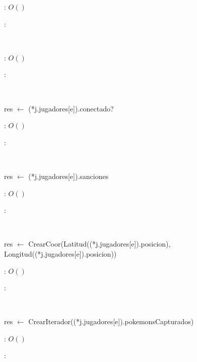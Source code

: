 \begin{Algoritmos}
	\complejidad: $O()$

	\justifcomp:

	~

	\begin{algorithm}[H]
		\NoCaptionOfAlgo
		\caption{}
	\end{algorithm}

	\complejidad: $O()$

	\justifcomp:

	~

	\begin{algorithm}[H]
		\NoCaptionOfAlgo
		\caption{}
		res $\leftarrow$ (*j.jugadores[e]).conectado?\;
	\end{algorithm}

	\complejidad: $O()$

	\justifcomp:

	~

	\begin{algorithm}[H]
		\NoCaptionOfAlgo
		\caption{}
		res $\leftarrow$ (*j.jugadores[e]).sanciones\;
	\end{algorithm}

	\complejidad: $O()$

	\justifcomp:

	~

	\begin{algorithm}[H]
		\NoCaptionOfAlgo
		\caption{}
		res $\leftarrow$ CrearCoor(Latitud((*j.jugadores[e]).posicion), Longitud((*j.jugadores[e]).posicion))\;
	\end{algorithm}

	\complejidad: $O()$

	\justifcomp:

	~

	\begin{algorithm}[H]
		\NoCaptionOfAlgo
		\caption{}
		res $\leftarrow$ CrearIterador((*j.jugadores[e]).pokemonsCapturados)\;
	\end{algorithm}

	\complejidad: $O()$

	\justifcomp:

	~

	\begin{algorithm}[H]
		\NoCaptionOfAlgo
		\caption{}
	\end{algorithm}


\end{Algoritmos}
